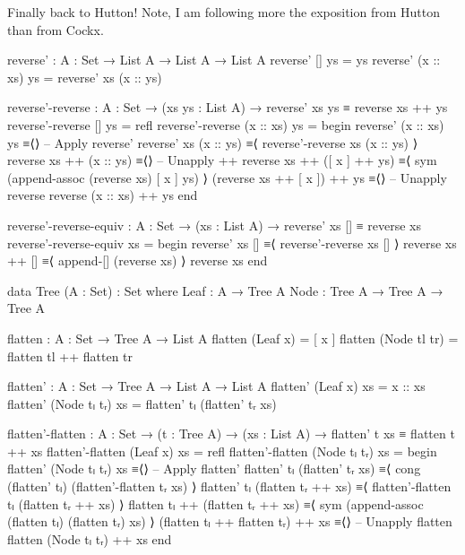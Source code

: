 \documentclass{article}
\begin{document}
\noindent
Finally back to Hutton! Note, I am following more the exposition from Hutton than from Cockx.

\begin{code}
reverse' : {A : Set} → List A → List A → List A
reverse' [] ys = ys
reverse' (x :: xs) ys = reverse' xs (x :: ys)
\end{code}

\begin{code}
reverse'-reverse : {A : Set} → (xs ys : List A)
    → reverse' xs ys ≡ reverse xs ++ ys
reverse'-reverse [] ys = refl
reverse'-reverse (x :: xs) ys =
  begin
    reverse' (x :: xs) ys
  ≡⟨⟩ -- Apply reverse'
    reverse' xs (x :: ys)
  ≡⟨ reverse'-reverse xs (x :: ys) ⟩
    reverse xs ++ (x :: ys)
  ≡⟨⟩ -- Unapply ++
    reverse xs ++ ([ x ] ++ ys)
  ≡⟨ sym (append-assoc (reverse xs) [ x ] ys) ⟩
    (reverse xs ++ [ x ]) ++ ys
  ≡⟨⟩ -- Unapply reverse
    reverse (x :: xs) ++ ys
  end
\end{code}

\begin{code}
reverse'-reverse-equiv : {A : Set} → (xs : List A)
    → reverse' xs [] ≡ reverse xs
reverse'-reverse-equiv xs =
  begin
    reverse' xs []
  ≡⟨ reverse'-reverse xs [] ⟩
    reverse xs ++ []
  ≡⟨ append-[] (reverse xs) ⟩
    reverse xs
  end
\end{code}

\begin{code}
data Tree (A : Set) : Set where
    Leaf : A → Tree A
    Node : Tree A → Tree A → Tree A

flatten : {A : Set} → Tree A → List A
flatten (Leaf x) = [ x ]
flatten (Node tl tr) = flatten tl ++ flatten tr

flatten' : {A : Set } → Tree A → List A → List A
flatten' (Leaf x) xs = x :: xs
flatten' (Node tₗ tᵣ) xs = flatten' tₗ (flatten' tᵣ xs)

flatten'-flatten : {A : Set} → (t : Tree A) → (xs : List A)
    → flatten' t xs ≡ flatten t ++ xs
flatten'-flatten (Leaf x) xs = refl
flatten'-flatten (Node tₗ tᵣ) xs =
  begin
    flatten' (Node tₗ tᵣ) xs
  ≡⟨⟩ -- Apply flatten'
    flatten' tₗ (flatten' tᵣ xs)
  ≡⟨ cong (flatten' tₗ) (flatten'-flatten tᵣ xs) ⟩
    flatten' tₗ (flatten tᵣ ++ xs)
  ≡⟨ flatten'-flatten tₗ (flatten tᵣ ++ xs) ⟩
    flatten tₗ ++ (flatten tᵣ ++ xs)
  ≡⟨ sym (append-assoc (flatten tₗ) (flatten tᵣ) xs) ⟩
    (flatten tₗ ++ flatten tᵣ) ++ xs
  ≡⟨⟩ -- Unapply flatten
    flatten (Node tₗ tᵣ) ++ xs
  end
\end{code}
\end{document}
